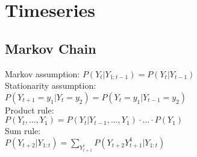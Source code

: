 \section*{Timeseries}
\subsection*{Markov Chain}
Markov assumption: $P(Y_t|Y_{1:t-1}) = P(Y_t|Y_{t-1})$\\
Stationarity assumption:\\
$P(Y_{t+1}=y_1|Y_t=y_2) = P(Y_t=y_1|Y_{t-1}=y_2)$\\
Product rule:\\
$P(Y_t,...,Y_1) = P(Y_t|Y_{t-1},...,Y_1)\cdot ... \cdot P(Y_1)$\\
Sum rule:\\
$P(Y_{t+2}|Y_{1:t}) = \sum_{Y_{t+1}^i} P(Y_{t+2}Y_{t+1}^1|Y_{1:t})$